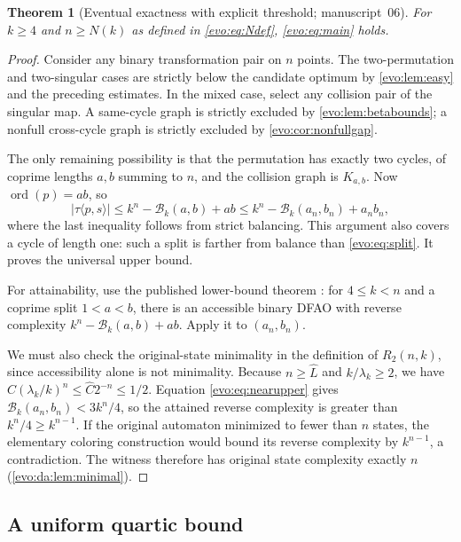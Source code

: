 \documentclass[11pt,a4paper]{article}
\numberwithin{equation}{section}
\newtheorem{theorem}{Theorem}[section]
\theoremstyle{definition}
\theoremstyle{remark}
\newcommand{\ord}{\operatorname{ord}}
\newcommand{\Bip}{\mathcal B}
\begin{document}
\begin{theorem}[Eventual exactness with explicit threshold; manuscript~06]\label{evo:thm:eventual}
For $k\ge4$ and $n\ge N(k)$ as defined in \eqref{evo:eq:Ndef},
\eqref{evo:eq:main} holds.
\end{theorem}
\begin{proof}
Consider any binary transformation pair on $n$ points. The two-permutation
and two-singular cases are strictly below the candidate optimum by
\cref{evo:lem:easy} and the preceding estimates. In the mixed case, select any
collision pair of the singular map. A same-cycle graph is strictly excluded by
\cref{evo:lem:betabounds}; a nonfull cross-cycle graph is strictly excluded by
\cref{evo:cor:nonfullgap}.

The only remaining possibility is that the permutation has exactly two
cycles, of coprime lengths $a,b$ summing to $n$, and the collision graph is
$K_{a,b}$. Now $\ord(p)=ab$, so
\[
 |\tau\langle p,s\rangle|\le k^n-\Bip_k(a,b)+ab
                         \le k^n-\Bip_k(a_n,b_n)+a_nb_n,
\]
where the last inequality follows from strict balancing. This argument also
covers a cycle of length one: such a split is farther from balance than
\eqref{evo:eq:split}. It proves the universal upper bound.

For attainability, use the published lower-bound theorem
\cite[Theorem~3 and Corollary~3]{Davies2017}: for $4\le k<n$ and a coprime
split $1<a<b$, there is an accessible binary DFAO with reverse complexity
$k^n-\Bip_k(a,b)+ab$. Apply it to $(a_n,b_n)$.

We must also check the original-state minimality in the definition of
$R_2(n,k)$, since accessibility alone is not minimality. Because
$n\ge\hat L$ and $k/\lambda_k\ge2$, we have
$\hat C(\lambda_k/k)^n\le\hat C2^{-n}\le1/2$. Equation \eqref{evo:eq:nearupper}
gives $\Bip_k(a_n,b_n)<3k^n/4$, so the attained reverse complexity is greater
than $k^n/4\ge k^{n-1}$. If the original automaton minimized to fewer than $n$
states, the elementary coloring construction would bound its reverse
complexity by $k^{n-1}$, a contradiction. The witness therefore has original
state complexity exactly $n$ (\cref{evo:da:lem:minimal}).
\end{proof}

\subsection{A uniform quartic bound}
\end{document}
